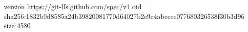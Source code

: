 version https://git-lfs.github.com/spec/v1
oid sha256:1832b9d8585a24b39820081770d64027b2e9e4abcece077680326538f30b3d96
size 4580
